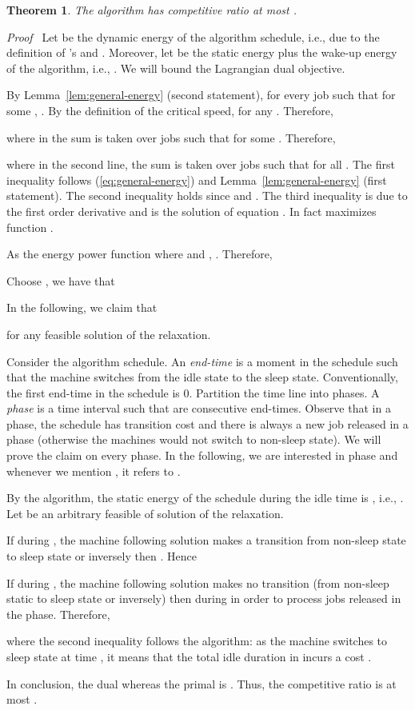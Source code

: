 \documentclass[11pt]{article}
\newenvironment{proof}{\noindent\emph{Proof\ }}{\hspace*{\fill}\medskip}
\newtheorem{theorem}{Theorem}
\begin{document}
\begin{theorem}
The algorithm has competitive ratio at most .
\end{theorem}
\begin{proof}
Let  be the dynamic energy of the algorithm 
schedule, i.e., 
due to the definition of 's and . 
Moreover, let  be the static energy plus the wake-up energy of the algorithm, i.e.,
.
We will bound the Lagrangian dual objective. 

By Lemma~\ref{lem:general-energy} (second statement), 
for every job  such that  for some , 
. By the definition of the critical speed,
 for any . Therefore,

where in the sum is taken over jobs  such that 
 for some .  Therefore,

where in the second line, the sum is taken over jobs  such that 
 for all .
The first inequality follows (\ref{eq:general-energy}) and Lemma~\ref{lem:general-energy} (first statement).
The second inequality holds since  and . 
The third inequality is due to the first order derivative 
and  is the solution of equation .
In fact  maximizes function .

As the energy power function  where  and , 
. Therefore,

Choose , we have that


In the following, we claim that 

for any feasible solution  of the relaxation.

Consider the algorithm schedule. An \emph{end-time}  is a moment in the schedule such
that the machine switches from the idle state to the sleep state. 
Conventionally, the first end-time in the schedule is 0. 
Partition the time line into phases. A \emph{phase}  is a time interval such that 
are consecutive end-times. Observe that in a phase, the schedule
has transition cost  and there is always a new job released in a phase
(otherwise the machines would not switch to non-sleep state).
We will prove the claim on every phase. In the following, 
we are interested in phase  and whenever we mention , 
it refers to . 

By the algorithm, the static energy of the schedule during 
the idle time is , \linebreak i.e., . 
Let  be an arbitrary feasible of solution of the relaxation. 

If during , the machine following solution  makes a transition from
non-sleep state to sleep state or inversely then 
. Hence



If during , the machine following solution  makes no transition (from
non-sleep static to sleep state or inversely) then  during  in order to 
process jobs released in the phase. Therefore, 

where the second inequality follows the algorithm: as the machine switches to sleep state 
at time , it means that the total idle duration in  incurs a cost .

In conclusion, the dual 
whereas the primal is . Thus, 
the competitive ratio is at most .
\end{proof}
\end{document}
